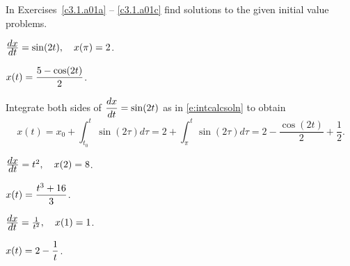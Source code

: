 \documentclass{ximera}
\begin{document}
\EXER

\TEXER


\noindent In Exercises~\ref{c3.1.a01a} -- \ref{c3.1.a01c} find
solutions to the given initial value problems.
\begin{exercise} \label{c3.1.a01a}
$\frac{\displaystyle dx}{\displaystyle dt} = \sin(2t),\quad x(\pi) = 2$.

\begin{solution}

\ans $\displaystyle x(t) = \frac{5 - \cos(2t)}{2}$.

\soln Integrate both sides of $\displaystyle\frac{dx}{dt} = \sin(2t)$ as in
\eqref{e:intcalcsoln} to obtain
\[
x(t) = x_0 + \int_{t_0}^{t}\sin(2\tau)d\tau =
2 + \int_{\pi}^{t}\sin(2\tau)d\tau = 2 - \frac{\cos(2t)}{2} +
\frac{1}{2}.
\]

\end{solution}
\end{exercise}
\begin{exercise} \label{c3.1.a01b}
$\frac{\displaystyle dx}{\displaystyle dt} = t^2, \quad x(2) = 8$.

\begin{solution}
$\displaystyle x(t) = \frac{t^3 + 16}{3}$.

\end{solution}
\end{exercise}
\begin{exercise} \label{c3.1.a01c}
$\frac{\displaystyle dx}{\displaystyle dt} = \frac{1}{t^2},\quad x(1)=1$.

\begin{solution}
$\displaystyle x(t) = 2 - \frac{1}{t}$.

\end{solution}
\end{exercise}
\end{document}
